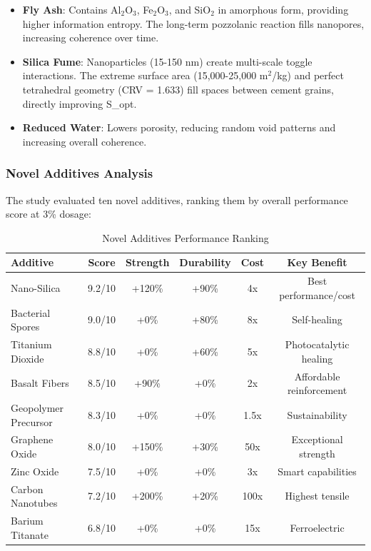 \documentclass[11pt,a4paper]{article}
\begin{document}
\begin{itemize}
    \item \textbf{Fly Ash}: Contains Al$_2$O$_3$, Fe$_2$O$_3$, and SiO$_2$ in amorphous form, providing higher information entropy. The long-term pozzolanic reaction fills nanopores, increasing coherence over time.
    
    \item \textbf{Silica Fume}: Nanoparticles (15-150 nm) create multi-scale toggle interactions. The extreme surface area (15,000-25,000 m$^2$/kg) and perfect tetrahedral geometry (CRV = 1.633) fill spaces between cement grains, directly improving S\_opt.
    
    \item \textbf{Reduced Water}: Lowers porosity, reducing random void patterns and increasing overall coherence.
\end{itemize}

\subsubsection{Novel Additives Analysis}

The study evaluated ten novel additives, ranking them by overall performance score at 3\% dosage:

\begin{table}[H]
\centering
\caption{Novel Additives Performance Ranking}
\begin{tabular}{lccccc}
\toprule
\textbf{Additive} & \textbf{Score} & \textbf{Strength} & \textbf{Durability} & \textbf{Cost} & \textbf{Key Benefit} \\
\midrule
Nano-Silica & 9.2/10 & +120\% & +90\% & 4x & Best performance/cost \\
Bacterial Spores & 9.0/10 & +0\% & +80\% & 8x & Self-healing \\
Titanium Dioxide & 8.8/10 & +0\% & +60\% & 5x & Photocatalytic healing \\
Basalt Fibers & 8.5/10 & +90\% & +0\% & 2x & Affordable reinforcement \\
Geopolymer Precursor & 8.3/10 & +0\% & +0\% & 1.5x & Sustainability \\
Graphene Oxide & 8.0/10 & +150\% & +30\% & 50x & Exceptional strength \\
Zinc Oxide & 7.5/10 & +0\% & +0\% & 3x & Smart capabilities \\
Carbon Nanotubes & 7.2/10 & +200\% & +20\% & 100x & Highest tensile \\
Barium Titanate & 6.8/10 & +0\% & +0\% & 15x & Ferroelectric \\
\bottomrule
\end{tabular}
\end{table}
\end{document}
